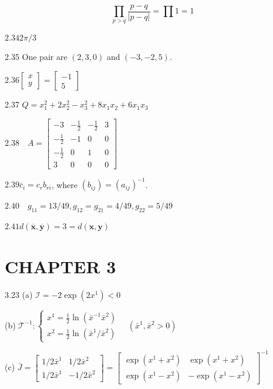 \documentclass[10pt]{article}
\begin{document}
$$
\prod_{p>q} \frac{p-q}{|p-q|}=\prod 1=1
$$

$2.342 \pi / 3$

2.35 One pair are $(2,3,0)$ and $(-3,-2,5)$.

$2.36\left[\begin{array}{l}x \\ y\end{array}\right]=\left[\begin{array}{r}-1 \\ 5\end{array}\right]$

2.37 $Q=x_{1}^{2}+2 x_{2}^{2}-x_{3}^{2}+8 x_{1} x_{2}+6 x_{1} x_{3}$

$2.38 \quad A=\left[\begin{array}{rrrr}-3 & -\frac{1}{2} & -\frac{1}{2} & 3 \\ -\frac{1}{2} & -1 & 0 & 0 \\ -\frac{1}{2} & 0 & 1 & 0 \\ 3 & 0 & 0 & 0\end{array}\right]$

$2.39 \bar{c}_{i}=c_{r} b_{r i}$, where $\left(b_{i j}\right)=\left(a_{i j}\right)^{-1}$.

$2.40 \quad g_{11}=13 / 49, g_{12}=g_{21}=4 / 49, g_{22}=5 / 49$

$2.41 d(\overline{\mathbf{x}}, \overline{\mathbf{y}})=3=d(\mathbf{x}, \mathbf{y})$

\section*{CHAPTER 3}
3.23 (a) $\mathscr{I}=-2 \exp \left(2 x^{1}\right)<0$

(b) $\mathscr{T}^{-1}:\left\{\begin{array}{l}x^{1}=\frac{1}{2} \ln \left(\bar{x}^{-1} \bar{x}^{2}\right) \\ x^{2}=\frac{1}{2} \ln \left(\bar{x}^{1} / \bar{x}^{2}\right)\end{array} \quad\left(\bar{x}^{1}, \bar{x}^{2}>0\right)\right.$

(c) $\bar{J}=\left[\begin{array}{rr}1 / 2 \bar{x}^{1} & 1 / 2 \bar{x}^{2} \\ 1 / 2 \bar{x}^{1} & -1 / 2 \bar{x}^{2}\end{array}\right]=\left[\begin{array}{rr}\exp \left(x^{1}+x^{2}\right) & \exp \left(x^{1}+x^{2}\right) \\ \exp \left(x^{1}-x^{2}\right) & -\exp \left(x^{1}-x^{2}\right)\end{array}\right]^{-1}$
\end{document}
